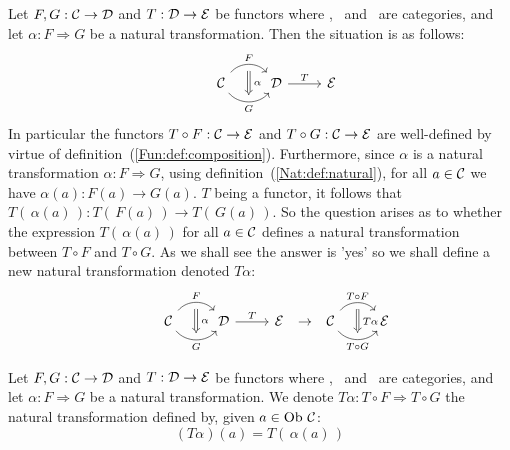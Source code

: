 Let $F,G:\mbox{$\cal C$}\to\mbox{$\cal D$}$ and $T:\mbox{$\cal D$}\to\mbox{$\cal E$}$ be functors where \Cat, \Dat\ and \Eat\ 
are categories, and let $\alpha:F\Rightarrow G$ be a natural 
transformation. Then the situation is as follows: 
    \[
        \begin{tikzcd}
            & \Cat \arrow[r, "F", bend left  = 50, ""{name=U, below}]
                 \arrow[r, swap, "G", bend right = 50, ""{name=D, above}]
            & \Dat 
            \arrow[Rightarrow, "\,\alpha", from = U, to = D]
            \arrow[r,"T"]
            & \Eat
        \end{tikzcd}
    \] 
In particular the functors $T\circ F:\mbox{$\cal C$}\to\mbox{$\cal E$}$ and $T\circ G:\mbox{$\cal C$}\to\mbox{$\cal E$}$
are well-defined by virtue of definition~(\ref{Fun:def:composition}). Furthermore, 
since $\alpha$ is a natural transformation $\alpha:F\Rightarrow G$,
using definition~(\ref{Nat:def:natural}), for all $a\in\mbox{$\cal C$}$ we have 
$\alpha(a):F(a)\to G(a)$. $T$ being a functor, it follows that 
$T(\,\alpha(a)\,) : T(\,F(a)\,)\to T(\,G(a)\,)$. So the question arises 
as to whether the expression $T(\,\alpha(a)\,)$ for all $a\in\mbox{$\cal C$}$ defines 
a natural transformation between $T\circ F$ and $T\circ G$. As we shall see the 
answer is 'yes' so we shall define a new natural transformation denoted 
$T\alpha$:
    \[
        \begin{tikzcd}
            & \Cat \arrow[r, "F", bend left  = 50, ""{name=U, below}]
                 \arrow[r, swap, "G", bend right = 50, ""{name=D, above}]
            & \Dat
            \arrow[Rightarrow, "\,\alpha", from = U, to = D]
            \arrow[r,"T"]
            & \Eat
        \end{tikzcd}
        \ \to\ 
        \begin{tikzcd}
            \Cat \arrow[r, "T\circ F", bend left  = 50, ""{name=U, below}]
                 \arrow[r, swap, "T\circ G", bend right = 50, ""{name=D, above}]
            & \Eat
            \arrow[Rightarrow, "\,T\alpha", from = U, to = D]
        \end{tikzcd}
    \]
\begin{defin}\label{Nat:def:leftmul}
    Let $F,G:\mbox{$\cal C$}\to\mbox{$\cal D$}$ and $T:\mbox{$\cal D$}\to\mbox{$\cal E$}$ be functors where \Cat, \Dat\ 
    and \Eat\ are categories, and let $\alpha:F\Rightarrow G$ be a natural 
    transformation. We denote $T\alpha: T\circ F\Rightarrow T\circ G$ the 
    natural transformation defined by, given $a\in\mbox{\rm Ob}\ \mbox{$\cal C$}$:
        \[
            (T\alpha)(a) = T(\,\alpha(a)\,)
        \]
\end{defin}  

